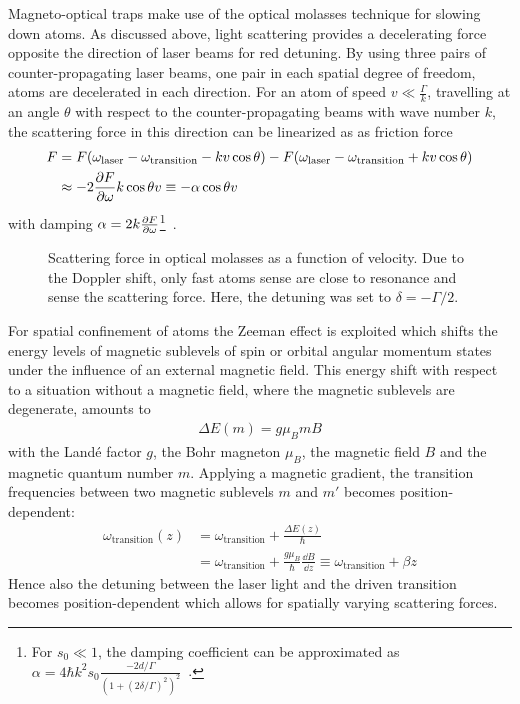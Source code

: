 Magneto-optical traps make use of the optical molasses technique for slowing down atoms. As discussed above, light scattering provides a decelerating force opposite the direction of laser beams for red detuning. By using three pairs of counter-propagating laser beams, one pair in each spatial degree of freedom, atoms are decelerated in each direction. For an atom of speed $v \ll \frac{\Gamma}{k}$, travelling at an angle $\theta$ with respect to the  counter-propagating beams with wave number $k$, the scattering force in this direction can be linearized as as friction force
\begin{equation}
    \begin{split}
        F &= F(\omega_\text{laser} - \omega_\text{transition} - kv \cos \theta) - F(\omega_\text{laser} - \omega_\text{transition} + kv \cos \theta) \\
        &\approx - 2 \pdv{F}{\omega} k \cos \theta v \equiv -\alpha \cos \theta v
    \end{split}
\end{equation}
with damping $\alpha = 2k \pdv{F}{\omega}$\footnote{For $s_0 \ll 1$, the damping coefficient can be approximated as $\alpha  = 4 \hbar k^2 s_0 \frac{-2d/\Gamma}{{\left(1+{{(2\delta/\Gamma)}}^2\right)}^2}$~\cite{foot_atomic_2005}.}~\cite{foot_atomic_2005}.

\begin{figure}
    \caption{Scattering force in optical molasses as a function of velocity. Due to the Doppler shift, only fast atoms sense are close to resonance and sense the scattering force. Here, the detuning was set to $\delta = -\Gamma/2$.}\label{fig:optical_molasses_force}
\end{figure}

For spatial confinement of atoms the Zeeman effect is exploited which shifts the energy levels of magnetic sublevels of spin or orbital angular momentum states under the influence of an external magnetic field. This energy shift with respect to a situation without a magnetic field, where the magnetic sublevels are degenerate, amounts to
\begin{align}
    \Delta E(m) = g \mu_B m B
\end{align}
with the Landé factor $g$, the Bohr magneton $\mu_B$, the magnetic field $B$ and the magnetic quantum number $m$. Applying a magnetic gradient, the transition frequencies between two magnetic sublevels $m$ and $m'$ becomes position-dependent:
\begin{equation}
    \begin{split}
      \omega_\text{transition}(z) &= \omega_\text{transition} + \frac{\Delta E(z)}{\hbar} \\  
      &= \omega_\text{transition} + \frac{g \mu_B}{\hbar} \frac{\dd B}{\dd z} \equiv \omega_\text{transition} + \beta z
    \end{split}
\end{equation}
Hence also the detuning between the laser light and the driven transition becomes position-dependent which allows for spatially varying scattering forces.

